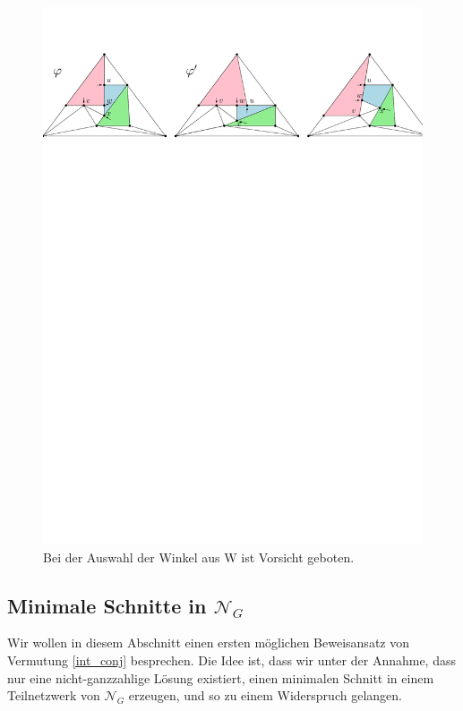 \begin{example}
\begin{figure}[h]
\centering
\includegraphics[width=1\textwidth]{lem_faa_choice_ex.pdf}
\caption{Bei der Auswahl der Winkel aus W ist Vorsicht geboten.}
\label{lem_faa_choice_ex}
\end{figure}
\end{example}

\subsection{Minimale Schnitte in $\mathcal{N}_G$}

Wir wollen in diesem Abschnitt einen ersten möglichen Beweisansatz von Vermutung \ref{int_conj} besprechen. Die Idee ist, dass wir unter der Annahme, dass nur eine nicht-ganzzahlige Lösung existiert, einen minimalen Schnitt in einem Teilnetzwerk von $\mathcal{N}_G$ erzeugen, und so zu einem Widerspruch gelangen. 

